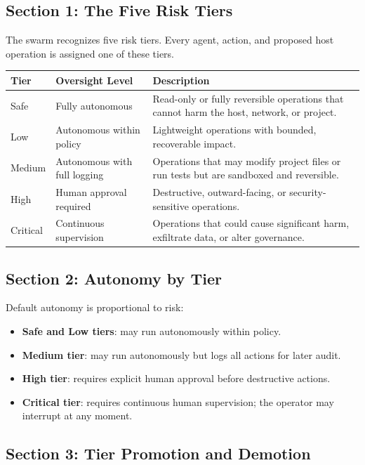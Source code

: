 \documentclass[12pt,letterpaper]{article}
\begin{document}
\subsection{Section 1: The Five Risk Tiers}

The swarm recognizes five risk tiers. Every agent, action, and proposed host operation is assigned one of these tiers.

\begin{longtable}{|p{2cm}|p{3cm}|p{8cm}|}
\hline
\textbf{Tier} & \textbf{Oversight Level} & \textbf{Description} \\
\hline
\endhead
Safe & Fully autonomous & Read-only or fully reversible operations that cannot harm the host, network, or project. \\
\hline
Low & Autonomous within policy & Lightweight operations with bounded, recoverable impact. \\
\hline
Medium & Autonomous with full logging & Operations that may modify project files or run tests but are sandboxed and reversible. \\
\hline
High & Human approval required & Destructive, outward-facing, or security-sensitive operations. \\
\hline
Critical & Continuous supervision & Operations that could cause significant harm, exfiltrate data, or alter governance. \\
\hline
\end{longtable}

\subsection{Section 2: Autonomy by Tier}

Default autonomy is proportional to risk:

\begin{itemize}
    \item \textbf{Safe and Low tiers}: may run autonomously within policy.
    \item \textbf{Medium tier}: may run autonomously but logs all actions for later audit.
    \item \textbf{High tier}: requires explicit human approval before destructive actions.
    \item \textbf{Critical tier}: requires continuous human supervision; the operator may interrupt at any moment.
\end{itemize}

\subsection{Section 3: Tier Promotion and Demotion}
\end{document}
